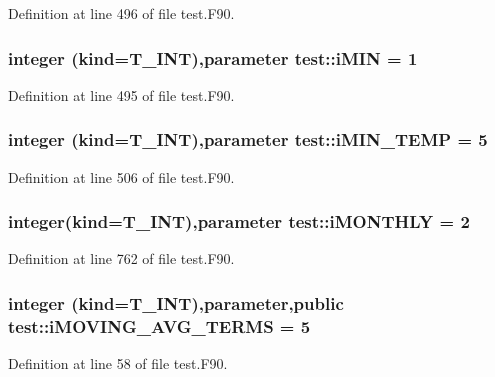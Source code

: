 Definition at line 496 of file test.F90.

\hypertarget{namespacetest_a5e4e66d4853b73ddeb16d8ec6d2f96ba}{
\subsubsection[{iMIN}]{\setlength{\rightskip}{0pt plus 5cm}integer (kind={\bf T\_\-INT}),parameter {\bf test::iMIN} = 1}}
\label{namespacetest_a5e4e66d4853b73ddeb16d8ec6d2f96ba}


Definition at line 495 of file test.F90.

\hypertarget{namespacetest_adbc94b4c943a3bf4995dff5b8d7ba7c3}{
\subsubsection[{iMIN\_\-TEMP}]{\setlength{\rightskip}{0pt plus 5cm}integer (kind={\bf T\_\-INT}),parameter {\bf test::iMIN\_\-TEMP} = 5}}
\label{namespacetest_adbc94b4c943a3bf4995dff5b8d7ba7c3}


Definition at line 506 of file test.F90.

\hypertarget{namespacetest_ae6a20a8c4dbaebffde9b9b7c933237b4}{
\subsubsection[{iMONTHLY}]{\setlength{\rightskip}{0pt plus 5cm}integer(kind={\bf T\_\-INT}),parameter {\bf test::iMONTHLY} = 2}}
\label{namespacetest_ae6a20a8c4dbaebffde9b9b7c933237b4}


Definition at line 762 of file test.F90.

\hypertarget{namespacetest_a01d23f78fddde9b4d7918751ce961815}{
\subsubsection[{iMOVING\_\-AVG\_\-TERMS}]{\setlength{\rightskip}{0pt plus 5cm}integer (kind={\bf T\_\-INT}),parameter,public {\bf test::iMOVING\_\-AVG\_\-TERMS} = 5}}
\label{namespacetest_a01d23f78fddde9b4d7918751ce961815}


Definition at line 58 of file test.F90.

